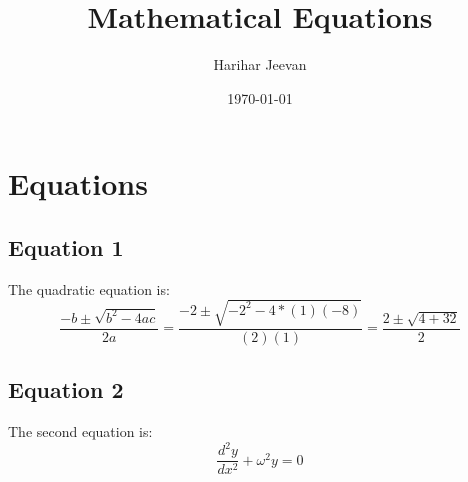 \documentclass{article}
\begin{document}
	\title{Mathematical Equations}
	\author{Harihar Jeevan}
	\date{\today}
	\maketitle
	\section*{Equations}
	\subsection*{Equation 1}
	The quadratic equation is:
	\begin{equation}
		\frac{{-b\pm\sqrt{b^2-4ac}}}{2a}=\frac{-2\pm\sqrt{-2^2-4*(1)(-8)}}{(2)(1)}=\frac{2\pm\sqrt{4+32}}{2}
	\end{equation}
	\subsection*{Equation 2}
	The second equation is:
	\begin{equation}
		\frac{d^2y}{dx^2}+\omega^2y=0
	\end{equation}
\end{document}
